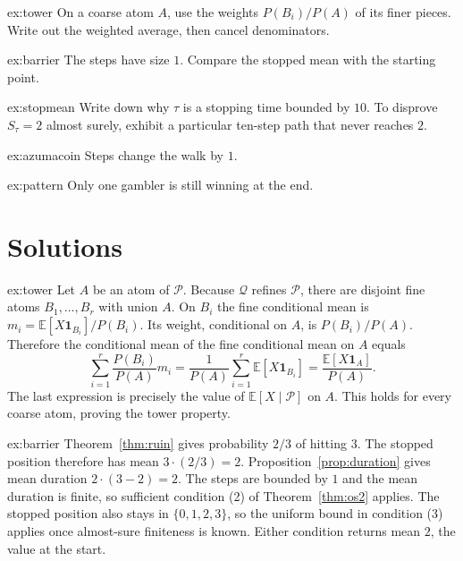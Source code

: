 \begin{hint}{ex:tower}
On a coarse atom $A$, use the weights $P(B_i)/P(A)$ of its finer pieces. Write out the weighted average, then cancel denominators.
\end{hint}
\begin{hint}{ex:barrier}
The steps have size $1$. Compare the stopped mean with the starting point.
\end{hint}
\begin{hint}{ex:stopmean}
Write down why $\tau$ is a stopping time bounded by $10$. To disprove $S_\tau=2$ almost surely, exhibit a particular ten-step path that never reaches $2$.
\end{hint}
\begin{hint}{ex:azumacoin}
Steps change the walk by $1$.
\end{hint}
\begin{hint}{ex:pattern}
Only one gambler is still winning at the end.
\end{hint}

\section{Solutions}

\begin{solution}{ex:tower}
\writeup Let $A$ be an atom of $\mathcal P$. Because $\mathcal Q$ refines $\mathcal P$, there are disjoint fine atoms $B_1,\ldots,B_r$ with union $A$. On $B_i$ the fine conditional mean is
$m_i=\mathbb E[X\mathbf1_{B_i}]/P(B_i)$. Its weight, conditional on $A$, is $P(B_i)/P(A)$. Therefore the conditional mean of the fine conditional mean on $A$ equals
\[
 \sum_{i=1}^r\frac{P(B_i)}{P(A)}m_i
 =\frac1{P(A)}\sum_{i=1}^r\mathbb E[X\mathbf1_{B_i}]
 =\frac{\mathbb E[X\mathbf1_A]}{P(A)}.
\]
The last expression is precisely the value of $\mathbb E[X\mid\mathcal P]$ on $A$. This holds for every coarse atom, proving the tower property.
\end{solution}

\begin{solution}{ex:barrier}
\writeup Theorem~\ref{thm:ruin} gives probability $2/3$ of hitting $3$. The stopped position therefore has mean $3\cdot(2/3)=2$. Proposition~\ref{prop:duration} gives mean duration $2\cdot(3-2)=2$. The steps are bounded by $1$ and the mean duration is finite, so sufficient condition (2) of Theorem~\ref{thm:os2} applies. The stopped position also stays in $\{0,1,2,3\}$, so the uniform bound in condition (3) applies once almost-sure finiteness is known. Either condition returns mean $2$, the value at the start.
\end{solution}

